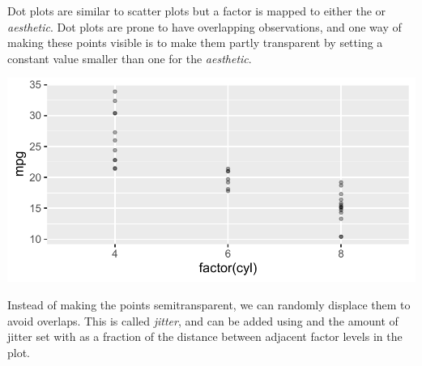 \documentclass[krantz2]{krantz}\usepackage{knitr}
\begin{document}
Dot plots are similar to scatter plots but a factor is mapped to either the  or  \emph{aesthetic}. Dot plots are prone to have overlapping observations, and one way of making these points visible is to make them partly transparent by setting a constant value smaller than one for the  \emph{aesthetic}.

\begin{knitrout}\footnotesize
{}\color{fgcolor}\begin{kframe}
\begin{alltt}
\hlstd{(}  \hlstd{(} \hlstd{=}    \hlopt{+}
  \hlstd{(} \hlstd{=} \hlopt{/}\hlstd{)}
\end{alltt}
\end{kframe}

{\centering \includegraphics[width=.7\textwidth]{figure/pos-scatter-12a-1} 

}


\end{knitrout}

Instead of making the points semitransparent, we can randomly displace them to avoid overlaps. This is called \emph{jitter}, and can be added using  and the amount of jitter set with  as a fraction of the distance between adjacent factor levels in the plot.

\begin{knitrout}\footnotesize
{}\color{fgcolor}\begin{kframe}
\begin{alltt}
\hlstd{(}  \hlstd{(} \hlstd{=}    \hlopt{+}
  \hlstd{(} \hlstd{=} \hlstd{(} \hlstd{=} \hlstd{))}
\end{alltt}
\end{kframe}
\end{knitrout}
\end{document}
